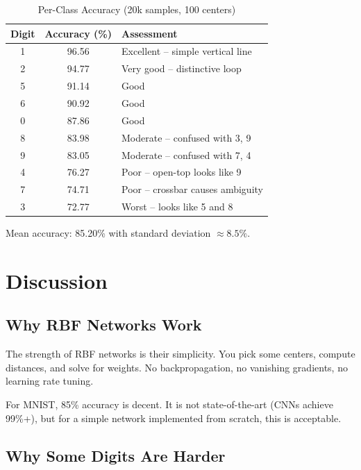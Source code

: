 \documentclass[12pt]{article}
\begin{document}
	\begin{table}[H]
		\centering
		\caption{Per-Class Accuracy (20k samples, 100 centers)}
		\begin{tabular}{ccl}
			\toprule
			\textbf{Digit} & \textbf{Accuracy (\%)} & \textbf{Assessment} \\
			\midrule
			1 & 96.56 & Excellent – simple vertical line \\
			2 & 94.77 & Very good – distinctive loop \\
			5 & 91.14 & Good \\
			6 & 90.92 & Good \\
			0 & 87.86 & Good \\
			8 & 83.98 & Moderate – confused with 3, 9 \\
			9 & 83.05 & Moderate – confused with 7, 4 \\
			4 & 76.27 & Poor – open-top looks like 9 \\
			7 & 74.71 & Poor – crossbar causes ambiguity \\
			3 & 72.77 & Worst – looks like 5 and 8 \\
			\bottomrule
		\end{tabular}
	\end{table}
	
	Mean accuracy: 85.20\% with standard deviation $\approx 8.5\%$.
	
	\section{Discussion}
	
	\subsection{Why RBF Networks Work}
	
	The strength of RBF networks is their simplicity. You pick some centers, compute distances, and solve for weights. No backpropagation, no vanishing gradients, no learning rate tuning.
	
	For MNIST, 85\% accuracy is decent. It is not state-of-the-art (CNNs achieve 99\%+), but for a simple network implemented from scratch, this is acceptable.
	
	\subsection{Why Some Digits Are Harder}
	
\end{document}
